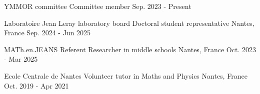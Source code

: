 

\begin{cvcompactentries}

\cvcompactentry
{YMMOR committee} %
{Committee member} %
{} %
{Sep. 2023 - Present} %
{}

\cvcompactentry
{Laboratoire Jean Leray laboratory board} %
{Doctoral student representative} %
{Nantes, France} %
{Sep. 2024 - Jun 2025} %
{}

\cvcompactentry
{MATh.en.JEANS} %
{Referent Researcher in middle schools} %
{Nantes, France} %
{Oct. 2023 - Mar 2025} %
{}

\cvcompactentry
{Ecole Centrale de Nantes} %
{Volunteer tutor in Maths and Physics} %
{Nantes, France} %
{Oct. 2019 - Apr 2021} %
{}

\end{cvcompactentries}
